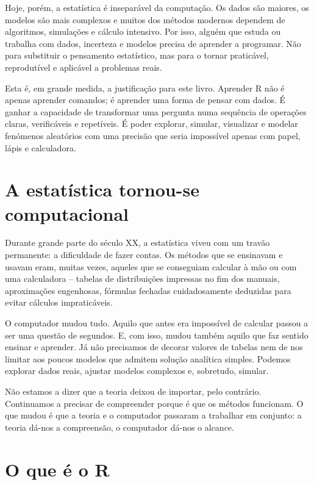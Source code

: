\documentclass[
  portuguese,
  11pt,
  openany]{book}
\begin{document}
Hoje, porém, a estatística é inseparável da computação. Os dados são maiores, os modelos são mais complexos e muitos dos métodos modernos dependem de algoritmos, simulações e cálculo intensivo. Por isso, alguém que estuda ou trabalha com dados, incerteza e modelos precisa de aprender a programar. Não para substituir o pensamento estatístico, mas para o tornar praticável, reprodutível e aplicável a problemas reais.

Esta é, em grande medida, a justificação para este livro. Aprender R não é apenas aprender comandos; é aprender uma forma de pensar com dados. É ganhar a capacidade de transformar uma pergunta numa sequência de operações claras, verificáveis e repetíveis. É poder explorar, simular, visualizar e modelar fenómenos aleatórios com uma precisão que seria impossível apenas com papel, lápis e calculadora.

\section{A estatística tornou-se computacional}\label{a-estatuxedstica-tornou-se-computacional}

Durante grande parte do século XX, a estatística viveu com um travão permanente: a dificuldade de fazer contas. Os métodos que se ensinavam e usavam eram, muitas vezes, aqueles que se conseguiam calcular à mão ou com uma calculadora -- tabelas de distribuições impressas no fim dos manuais, aproximações engenhosas, fórmulas fechadas cuidadosamente deduzidas para evitar cálculos impraticáveis.

O computador mudou tudo. Aquilo que antes era impossível de calcular passou a ser uma questão de segundos. E, com isso, mudou também aquilo que faz sentido ensinar e aprender. Já não precisamos de decorar valores de tabelas nem de nos limitar aos poucos modelos que admitem solução analítica simples. Podemos explorar dados reais, ajustar modelos complexos e, sobretudo, simular.

Não estamos a dizer que a teoria deixou de importar, pelo contrário. Continuamos a precisar de compreender porque é que os métodos funcionam. O que mudou é que a teoria e o computador passaram a trabalhar em conjunto: a teoria dá-nos a compreensão, o computador dá-nos o alcance.

\section{O que é o R}\label{o-que-uxe9-o-r}
\end{document}
